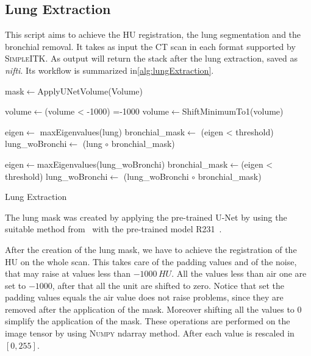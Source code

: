 \documentclass{standalone}
\begin{document}
	\subsection{Lung Extraction}
	
	This script aims to achieve the HU registration, the lung segmentation and the bronchial removal. It takes as input the CT scan in each format supported by \textsc{SimpleITK}.  As output will return the stack after the lung extraction, saved as \textit{nifti}.  Its workflow is summarized in\ref{alg:lungExtraction}.
	
		 
	\begin{algorithm}
		
		\SetAlgoLined
		\DontPrintSemicolon
	
		\;
		
		mask$\leftarrow$ApplyUNetVolume(Volume)\;
		
		volume$\leftarrow$(volume < -1000) =-1000\;
		volume$\leftarrow$ShiftMinimumTo1(volume)\;
		
		\;
		
		eigen$\leftarrow$ maxEigenvalues(lung)\;
		bronchial\_mask$\leftarrow$ (eigen < threshold)\;
		lung\_woBronchi$\leftarrow$ (lung $\circ$ bronchial\_mask)\;
		
		\;
		
		eigen$\leftarrow$maxEigenvalues(lung\_woBronchi)\;
		bronchial\_mask$\leftarrow$(eigen < threshold)\;
		lung\_woBronchi$\leftarrow$ (lung\_woBronchi $\circ$ bronchial\_mask)\;
	
		\caption{Lung Extraction}\label{alg:lungExtraction}
		
	\end{algorithm}
	
	
	The lung mask was created by applying the pre-trained U-Net by using the suitable method from~\cite{REP:lungmask} with the pre-trained model \textsc{R231}~\cite{ART:Johannes}.

	After the creation of the lung mask, we have to achieve the registration of the HU on the whole scan. This takes care of the padding values and of the noise, that may raise at values less than $-1000\,HU$. All the values less than air one are set to $-1000$, after that all the unit are shifted to zero. Notice that set the padding values equals the air value does not raise problems, since they are removed after the application of the mask. Moreover shifting all the values to $0$ simplify the application of the mask. These operations are performed on the image tensor by using \textsc{Numpy} ndarray method. After each value is rescaled in $[0, 255]$. 
	
\end{document}
